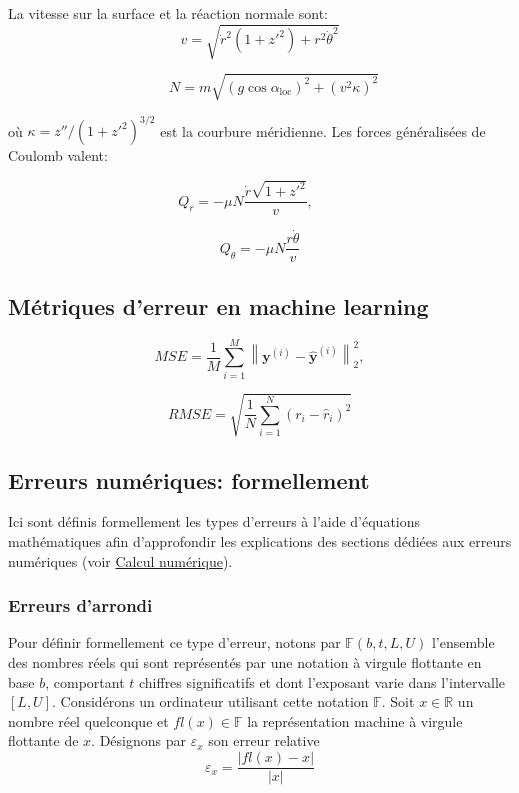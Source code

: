 \documentclass[
	a4paper, %
	10pt, %
	unnumberedsections, %
	twoside, %
]{LTJournalArticle}
\begin{document}
La vitesse sur la surface et la réaction normale sont:
\begin{equation}
    v = \sqrt{\dot{r}^2(1+z'^2)+r^2\dot{\theta}^2}
\end{equation}

\begin{equation}
    \qquad N = m\sqrt{(g\cos\alpha_\text{loc})^2+(v^2\kappa)^2}
\end{equation}

où $\kappa = z''/(1+z'^2)^{3/2}$ est la courbure méridienne.
Les forces généralisées de Coulomb valent:

\begin{equation}
        Q_r = -\mu N\frac{\dot{r}\sqrt{1+z'^2}}{v},\qquad 
\end{equation}

\begin{equation}
    Q_\theta = -\mu N\frac{r\dot{\theta}}{v}
\end{equation}



\subsection{Métriques d'erreur en machine learning}
\label{app:ml-metrics}
\begin{equation}
   MSE = \frac{1}{M} \sum_{i=1}^{M} \left\| \mathbf{y}^{(i)} - \hat{\mathbf{y}}^{(i)} \right\|_2^2,
\end{equation}

\begin{equation}
    RMSE = \sqrt{\frac{1}{N} \sum_{i=1}^{N} \left( r_i - \hat{r}_i \right)^2}
\end{equation}

\subsection{Erreurs numériques: formellement}
\label{annex:numerrors}

Ici sont définis formellement les types d'erreurs à l'aide d'équations mathématiques afin d'approfondir les explications des sections dédiées aux erreurs numériques
(voir \hyperref[sec:calcnum]{Calcul numérique}).

\subsubsection{Erreurs d'arrondi}

Pour définir formellement ce type d'erreur, notons par $\mathbb{F}(b, t, L, U)$
l'ensemble des nombres réels qui sont représentés par une notation à virgule
flottante en base $b$, comportant $t$ chiffres significatifs et dont l'exposant
varie dans l'intervalle $[L, U]$. Considérons un ordinateur utilisant cette
notation $\mathbb{F}$. Soit $x \in \mathbb{R}$ un nombre réel quelconque et
$fl(x) \in \mathbb{F}$ la représentation machine à virgule flottante de $x$.
Désignons par $\varepsilon_x$ son erreur relative
\begin{equation}
    \varepsilon_x = \frac{|fl(x) - x|}{|x|}
\end{equation}
\end{document}
